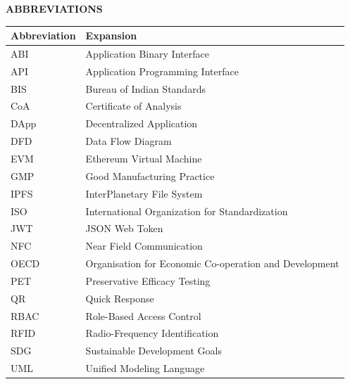 \documentclass[12pt,a4paper]{report}
\begin{document}
\newpage
\thispagestyle{plain}
\begin{center}
    {\Large \textbf{ABBREVIATIONS}\par}
\end{center}
\vspace{0.4cm}
\noindent
\begin{table}[H]
\centering
\renewcommand{\arraystretch}{1.12}
\begin{tabularx}{\textwidth}{p{3.2cm} Y}
\toprule
\textbf{Abbreviation} & \textbf{Expansion} \\
\midrule
ABI & Application Binary Interface \\
API & Application Programming Interface \\
BIS & Bureau of Indian Standards \\
CoA & Certificate of Analysis \\
DApp & Decentralized Application \\
DFD & Data Flow Diagram \\
EVM & Ethereum Virtual Machine \\
GMP & Good Manufacturing Practice \\
IPFS & InterPlanetary File System \\
ISO & International Organization for Standardization \\
JWT & JSON Web Token \\
NFC & Near Field Communication \\
OECD & Organisation for Economic Co-operation and Development \\
PET & Preservative Efficacy Testing \\
QR & Quick Response \\
RBAC & Role-Based Access Control \\
RFID & Radio-Frequency Identification \\
SDG & Sustainable Development Goals \\
UML & Unified Modeling Language \\
\bottomrule
\end{tabularx}
\end{table}

\newpage
{}
\setcounter{page}{1}

\end{document}
